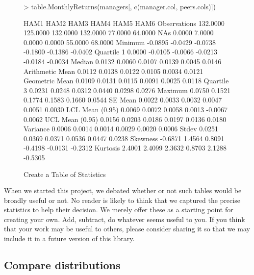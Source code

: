 \documentclass[12pt,letterpaper,english]{article}
\begin{document}
%
\begin{figure}

\caption{Create a Table of Statistics}

\label{fig:Statistics-Table}

\begin{center}

\begin{Schunk}
\begin{Sinput}
> table.MonthlyReturns(managers[, c(manager.col, peers.cols)])
\end{Sinput}
\begin{Soutput}
                    HAM1     HAM2     HAM3     HAM4    HAM5    HAM6
Observations    132.0000 125.0000 132.0000 132.0000 77.0000 64.0000
NAs               0.0000   7.0000   0.0000   0.0000 55.0000 68.0000
Minimum          -0.0895  -0.0429  -0.0738  -0.1800 -0.1386 -0.0402
Quartile 1        0.0000  -0.0105  -0.0066  -0.0213 -0.0184 -0.0034
Median            0.0132   0.0060   0.0107   0.0139  0.0045  0.0146
Arithmetic Mean   0.0112   0.0138   0.0122   0.0105  0.0034  0.0121
Geometric Mean    0.0109   0.0131   0.0115   0.0091  0.0025  0.0118
Quartile 3        0.0231   0.0248   0.0312   0.0440  0.0298  0.0276
Maximum           0.0750   0.1521   0.1774   0.1583  0.1660  0.0544
SE Mean           0.0022   0.0033   0.0032   0.0047  0.0051  0.0030
LCL Mean (0.95)   0.0069   0.0072   0.0058   0.0013 -0.0067  0.0062
UCL Mean (0.95)   0.0156   0.0203   0.0186   0.0197  0.0136  0.0180
Variance          0.0006   0.0014   0.0014   0.0029  0.0020  0.0006
Stdev             0.0251   0.0369   0.0371   0.0536  0.0447  0.0238
Skewness         -0.6871   1.4564   0.8091  -0.4198 -0.0131 -0.2312
Kurtosis          2.4001   2.4099   2.3632   0.8703  2.1288 -0.5305
\end{Soutput}
\end{Schunk}

\end{center}
\end{figure}


When we started this project, we debated whether or not such tables
would be broadly useful or not. No reader is likely to think that
we captured the precise statistics to help their decision. We merely
offer these as a starting point for creating your own. Add, subtract,
do whatever seems useful to you. If you think that your work may be
useful to others, please consider sharing it so that we may include
it in a future version of this library.


\subsection{Compare distributions}
\end{document}
